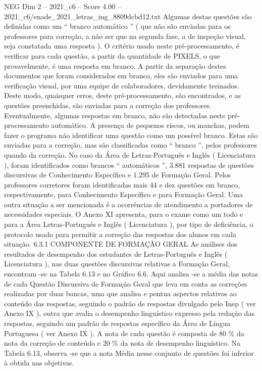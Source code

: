 \begin{textsample}{NEG Dim 2 – 2021\_c6 – Score 4.00 – 2021\_c6/enade\_2021\_letras\_ing\_8809dcbd12.txt}
Algumas destas questões são definidas como um “ branco automático ” ( que não são enviadas para os professores para correção, a não ser que na segunda fase, a de inspeção visual, seja constatada uma resposta ).
O critério usado neste pré-processamento, é verificar para cada questão, a partir da quantidade de PIXELS, o que provavelmente, é uma resposta em branco.
A partir da separação destes documentos que foram considerados em branco, eles são enviados para uma verificação visual, por uma equipe de colaboradores, devidamente treinados.
Deste modo, quaisquer erros, deste pré-processamento, são encontrados, e as questões preenchidas, são enviadas para a correção dos professores.
Eventualmente, algumas respostas em branco, não são detectadas neste pré-processamento automático.
A presença de pequenos riscos, ou manchas, podem fazer o programa não identificar uma questão como um possível branco.
Estas são enviadas para a correção, mas são classificadas como “ branco ”, pelos professores quando da correção.
No caso da Área de Letras-Português e Inglês ( Licenciatura ), foram identificados como brancos “ automáticos ”, 3.881 respostas de questões discursivas de Conhecimento Específico e 1.295 de Formação Geral.
Pelos professores corretores foram identificadas mais 44 e dez questões em branco, respectivamente, para Conhecimento Específico e para Formação Geral.
Uma outra situação a ser mencionada é a ocorrências de atendimento a portadores de necessidades especiais.
O Anexo XI apresenta, para o exame como um todo e para a Área Letras-Português e Inglês ( Licenciatura ), por tipo de deficiência, o protocolo usado para permitir a correção das respostas dos alunos em cada situação. 6.3.1 COMPONENTE DE FORMAÇÃO GERAL As análises dos resultados de desempenho dos estudantes de Letras-Português e Inglês ( Licenciatura ), nas duas questões discursivas relativas a Formação Geral, encontram -se na Tabela 6.13 e no Gráfico 6.6.
Aqui analisa -se a média das notas de cada Questão Discursiva de Formação Geral que leva em conta as correções realizadas por duas bancas, uma que analisa e pontua aspectos relativos ao conteúdo das respostas, seguindo o padrão de respostas divulgado pelo Inep ( ver Anexo IX ), outra que avalia o desempenho linguístico expresso pela redação das respostas, seguindo um padrão de respostas específico da Área de Língua Portuguesa ( ver Anexo IX ).
A nota de cada questão é composta de 80 \% da nota da correção de conteúdo e 20 \% da nota de desempenho linguístico.
Na Tabela 6.13, observa -se que a nota Média nesse conjunto de questões foi inferior à obtida nas objetivas.

\end{textsample}
